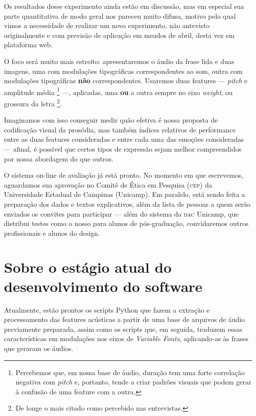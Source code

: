 \documentclass[a4paper,11pt,titlepage,singlespacing]{article}
\let\svthefootnote\thefootnote
\newcommand\Cfootnote[2][black]{\def\thefootnote{\color{#1}\svthefootnote}%
  \footnote{\color{#1}#2}}
\begin{document}
{    Os resultados desse experimento ainda estão em discussão, mas em especial sua parte quantitativa de modo geral nos pareceu muito difusa, motivo pelo qual vimos a necessidade de realizar um novo experimento, não antevisto originalmente e com previsão de aplicação em meados de abril, desta vez em plataforma web. 
    
    O foco será muito mais estreito: apresentaremos o áudio da frase lida e duas imagens, uma com modulações tipográficas correspondentes ao som, outra com modulações tipográficas \textbf{não} correspondentes. Usaremos duas features — \textit{pitch} e amplitude média\Cfootnote[pos_parecer]{Percebemos que, em nossa base de áudio, duração tem uma forte correlação negativa com \textit{pitch} e, portanto, tende a criar padrões visuais que podem gerar à confusão de uma feature com a outra.} —, aplicadas, uma \textbf{ou} a outra sempre no eixo \textit{weight}, ou grossura da letra\Cfootnote[pos_parecer]{De longe o mais citado como percebido nas entrevistas.}. 
    
    Imaginamos com isso conseguir medir quão efetiva é nossa proposta de codificação visual da prosódia, mas também índices relativos de performance entre as duas features consideradas e entre cada uma das emoções consideradas — afinal, é possível que certos tipos de expressão sejam melhor compreendidos por nossa abordagem do que outros.
    
    O sistema on-line de avaliação já está pronto. No momento em que escrevemos, aguardamos sua aprovação no Comitê de Ética em Pesquisa (\textsc{cep}) da Universidade Estadual de Campinas (Unicamp). Em paralelo, está sendo feita a preparação dos dados e textos explicativos, além da lista de pessoas a quem serão enviados os convites para participar — além do sistema da \textsc{dac} Unicamp, que distribui testes como o nosso para alunos de pós-graduação, convidaremos outros profissionais e alunos do design.



    \section{Sobre o estágio atual do desenvolvimento do software}
    
    Atualmente, estão prontos os scripts Python que fazem a extração e processamento das features acústicas a partir de uma base de arquivos de áudio previamente preparada, assim como os scripts que, em seguida, traduzem essas características em modulações nos eixos de \textit{Variable Fonts}, aplicando-as às frases que geraram os áudios.
    
}
\end{document}
